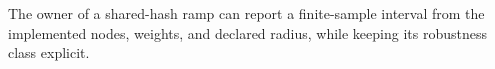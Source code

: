 The owner of a shared-hash ramp can report a finite-sample interval from the implemented nodes, weights, and declared radius, while keeping its robustness class explicit.